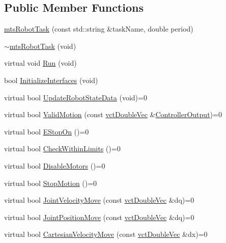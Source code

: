 \subsection*{Public Member Functions}
\begin{DoxyCompactItemize}
\item 
\hyperlink{classmts_robot_task_a979f05490a614e5c8f5fac858d9df124}{mts\-Robot\-Task} (const std\-::string \&task\-Name, double period)
\item 
\hyperlink{classmts_robot_task_a0b6b719c38e5efed8c3a69c688cf21e5}{$\sim$mts\-Robot\-Task} (void)
\item 
virtual void \hyperlink{classmts_robot_task_a7c6ceb57c621ab8d11a80de7519c9d9a}{Run} (void)
\item 
bool \hyperlink{classmts_robot_task_aa66512b6d30099ed89449889ecb26597}{Initialize\-Interfaces} (void)
\item 
virtual bool \hyperlink{classmts_robot_task_a1af7349c05645cb0044a7077202a1ce0}{Update\-Robot\-State\-Data} (void)=0
\item 
virtual bool \hyperlink{classmts_robot_task_a1a8a8be644f3c8563e3e21b27b42aac4}{Valid\-Motion} (const \hyperlink{vct_dynamic_vector_types_8h_ade4b3068c86fb88f41af2e5187e491c2}{vct\-Double\-Vec} \&\hyperlink{classmts_robot_task_aa263aa6c4baef69846e617cdca5cf91d}{Controller\-Output})=0
\item 
virtual bool \hyperlink{classmts_robot_task_acc7185144c7092c140702dc5a46bd176}{E\-Stop\-On} ()=0
\item 
virtual bool \hyperlink{classmts_robot_task_a91e9325ac08f5b07eea38434c2d6bbe4}{Check\-Within\-Limits} ()=0
\item 
virtual bool \hyperlink{classmts_robot_task_ae36c42cfe3a4e7371482c2c3e84c17fc}{Disable\-Motors} ()=0
\item 
virtual bool \hyperlink{classmts_robot_task_ac151cfa740af629eb9f63983c582981a}{Stop\-Motion} ()=0
\item 
virtual bool \hyperlink{classmts_robot_task_a17eaaf661fc37f1313071d64d9ee7e3f}{Joint\-Velocity\-Move} (const \hyperlink{vct_dynamic_vector_types_8h_ade4b3068c86fb88f41af2e5187e491c2}{vct\-Double\-Vec} \&dq)=0
\item 
virtual bool \hyperlink{classmts_robot_task_ae9665869aab61b998b7c5eef5e650ac0}{Joint\-Position\-Move} (const \hyperlink{vct_dynamic_vector_types_8h_ade4b3068c86fb88f41af2e5187e491c2}{vct\-Double\-Vec} \&dq)=0
\item 
virtual bool \hyperlink{classmts_robot_task_abec94c0fe8550d7034e822e03ada48c5}{Cartesian\-Velocity\-Move} (const \hyperlink{vct_dynamic_vector_types_8h_ade4b3068c86fb88f41af2e5187e491c2}{vct\-Double\-Vec} \&dx)=0

\end{DoxyCompactItemize}
